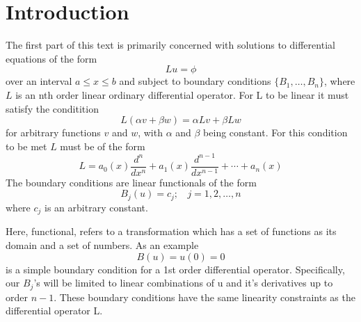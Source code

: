 \section{Introduction}
The first part of this text is primarily concerned with solutions to differential equations of the form
\begin{equation}
    Lu=\phi
\end{equation}
over an interval \(a \leq x \leq b\) and subject to boundary conditions \( \{ B_1, \dots ,B_n \} \), where \(L\) is an nth order linear ordinary differential operator.  For L to be linear it must satisfy the conditition
\begin{equation}
	L(\alpha v + \beta w) = \alpha Lv + \beta Lw
\end{equation}
for arbitrary functions \(v\) and \(w\), with \(\alpha\) and \(\beta\) being constant. For this condition to be met \(L\) must be of the form
\begin{equation} 
	L = a_0(x) \frac{d^n}{dx^n} + a_1(x) \frac{d^{n-1}}{dx^{n-1}} + \cdots + a_n(x)
\end{equation}
The boundary conditions are linear functionals of the form 
\begin{equation}
	B_j (u) = c_j;~~~~ j=1,2,\dots,n
\end{equation}
where \(c_j\) is an arbitrary constant. 

Here, functional, refers to a transformation which has a set of functions as its domain and a set of numbers. As an example
\begin{equation}
	B (u) = u(0) = 0
\end{equation}
is a simple boundary condition for a 1st order differential operator. Specifically, our \(B_j\)'s will be limited to linear combinations of u and it's derivatives up to order \(n-1\). These boundary conditions have the same linearity constraints as the differential operator L. 


